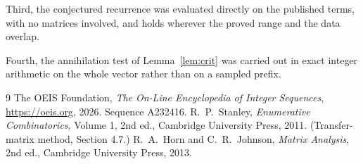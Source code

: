 \documentclass[11pt,a4paper]{article}
\theoremstyle{plain}
\theoremstyle{definition}
\begin{document}
Third, the conjectured recurrence was evaluated directly on the published terms, with no
matrices involved, and holds wherever the proved range and the data overlap.

Fourth, the annihilation test of Lemma~\ref{lem:crit} was carried out in exact integer
arithmetic on the whole vector rather than on a sampled prefix.

\begin{thebibliography}{9}
 The OEIS Foundation, \emph{The On-Line Encyclopedia of Integer
Sequences}, \url{https://oeis.org}, 2026. Sequence A232416.
 R.~P.~Stanley, \emph{Enumerative Combinatorics}, Volume 1, 2nd ed.,
Cambridge University Press, 2011. (Transfer-matrix method, Section 4.7.)
 R.~A.~Horn and C.~R.~Johnson, \emph{Matrix Analysis}, 2nd ed., Cambridge
University Press, 2013.
\end{thebibliography}
\end{document}
